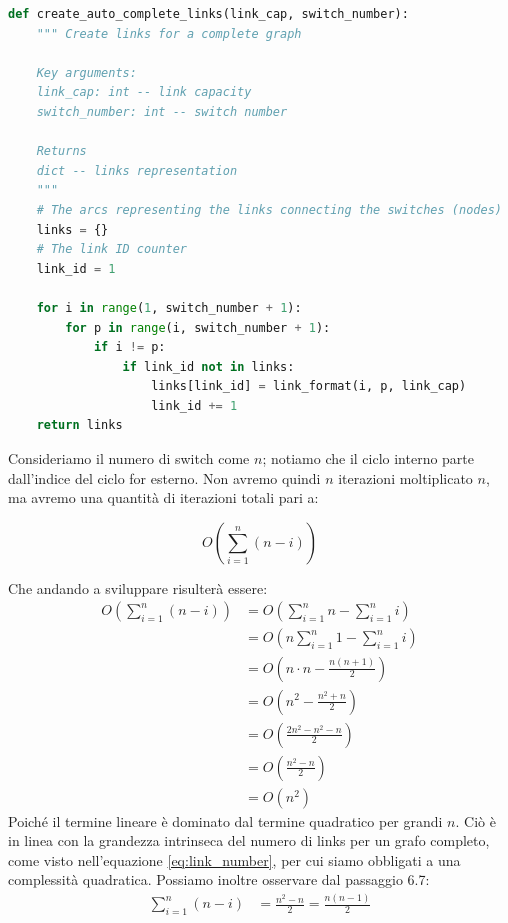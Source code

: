 \documentclass[binding=0.6cm]{sapthesis}
\begin{document}
{\scriptsize %
\begin{lstlisting}[language=Python, basicstyle=\ttfamily, caption={Funzione per la creazione automatica di un grafo di rete completo}, label={codice:create_auto_complete_links}]
    def create_auto_complete_links(link_cap, switch_number):
    """ Create links for a complete graph 
    
    Key arguments:
    link_cap: int -- link capacity
    switch_number: int -- switch number

    Returns
    dict -- links representation
    """
    # The arcs representing the links connecting the switches (nodes)
    links = {}
    # The link ID counter
    link_id = 1

    for i in range(1, switch_number + 1):
        for p in range(i, switch_number + 1):
            if i != p:
                if link_id not in links:
                    links[link_id] = link_format(i, p, link_cap)
                    link_id += 1
    return links
\end{lstlisting}
} %

Consideriamo il numero di switch come \(n\); notiamo che il ciclo interno parte dall'indice del ciclo for esterno. 
Non avremo quindi \(n\) iterazioni moltiplicato \(n\),
ma avremo una quantità di iterazioni totali pari a:

\begin{equation}
    O\left(\sum_{i=1}^n (n-i)\right)
\end{equation}

Che andando a sviluppare risulterà essere:
\begin{align}
    O\left(\sum_{i=1}^n (n-i)\right) &= O\left(\sum_{i=1}^n n - \sum_{i=1}^n i\right) \\
    &= O\left(n\sum_{i=1}^n 1 - \sum_{i=1}^n i\right) \\
    &= O\left(n \cdot n - \frac{n(n+1)}{2}\right) \\
    &= O\left(n^2 - \frac{n^2 + n}{2}\right) \\
    &= O\left(\frac{2n^2 - n^2 - n}{2}\right) \\
    &= O\left(\frac{n^2 - n}{2}\right) \\
    &= O(n^2) \quad
    \end{align}
Poiché il termine lineare è dominato dal termine quadratico per grandi \( n \). Ciò è in linea con la grandezza intrinseca del numero di links
per un grafo completo, come visto nell'equazione \ref{eq:link_number}, per cui siamo obbligati a una complessità quadratica.
Possiamo inoltre osservare dal passaggio 6.7:
\begin{align*}
    \sum_{i=1}^n (n-i) &= \frac{n^2 - n}{2} = \frac{n(n-1)}{2}
\end{align*}
    
\end{document}
